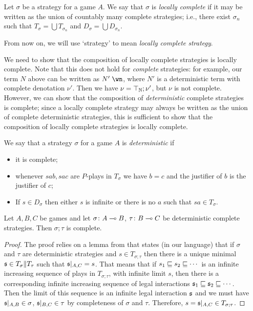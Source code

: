 \documentclass[sigplan,10pt,review]{acmart}\settopmatter{printfolios=true,printccs=false,printacmref=false}
\begin{document}
\begin{definition}
  Let $\sigma$ be a strategy for a game $A$.  
  We say that $\sigma$ is \emph{locally complete} if it may be written as the union of countably many complete strategies; i.e., there exist $\sigma_n$ such that $T_\sigma=\bigcup T_{\sigma_n}$ and $D_\sigma=\bigcup D_{\sigma_n}$.
\end{definition}

From now on, we will use `strategy' to mean \emph{locally complete strategy}.

We need to show that the composition of locally complete strategies is locally complete.  
Note that this does not hold for \emph{complete} strategies: for example, our term $N$ above can be written as $N'\;\wn$, where $N'$ is a deterministic term with complete denotation $\nu'$.  
Then we have $\nu=\top_{\mathbb{N}};\nu'$, but $\nu$ is not complete.
However, we can show that the composition of \emph{deterministic} complete strategies is complete; since a locally complete strategy may always be written as the union of complete deterministic strategies, this is sufficient to show that the composition of locally complete strategies is locally complete.

\begin{definition}
  We say that a strategy $\sigma$ for a game $A$ is \emph{deterministic} if
  \begin{itemize}
    \item it is complete;
    \item whenever $sab,sac$ are $P$-plays in $T_\sigma$ we have $b=c$ and the justifier of $b$ is the justifier of $c$;
    \item If $s\in D_\sigma$ then either $s$ is infinite or there is no $a$ such that $sa\in T_\sigma$.
  \end{itemize}
\end{definition}

\begin{lemma}
  Let $A,B,C$ be games and let $\sigma\colon A\multimap B$, $\tau\colon B\multimap C$ be deterministic complete strategies.  
  Then $\sigma;\tau$ is complete.
  \label{lem:complete-deterministic-composition}
\end{lemma}
\begin{proof}
  The proof relies on a lemma from \cite{hoPcf} that states (in our language) that if $\sigma$ and $\tau$ are deterministic strategies and $s\in T_{\sigma;\tau}$ then there is a unique minimal $\mathfrak s\in T_\sigma\|T_\tau$ such that $\mathfrak s\vert_{A,C}=s$.  
  That means that if $s_1\sqsubseteq s_2\sqsubseteq \cdots$ is an infinite increasing sequence of plays in $T_{\sigma;\tau}$, with infinite limit $s$, then there is a corresponding infinite increasing sequence of legal interactions $\mathfrak s_1 \sqsubseteq \mathfrak s_2 \sqsubseteq \cdots$.  
  Then the limit of this sequence is an infinite legal interaction $\mathfrak s$ and we must have $\mathfrak s\vert_{A,B}\in\sigma$, $\mathfrak s\vert_{B,C}\in\tau$ by completeness of $\sigma$ and $\tau$.  
  Therefore, $s=\mathfrak s\vert_{A,C}\in T_{\sigma;\tau}$.
\end{proof}
\end{document}
